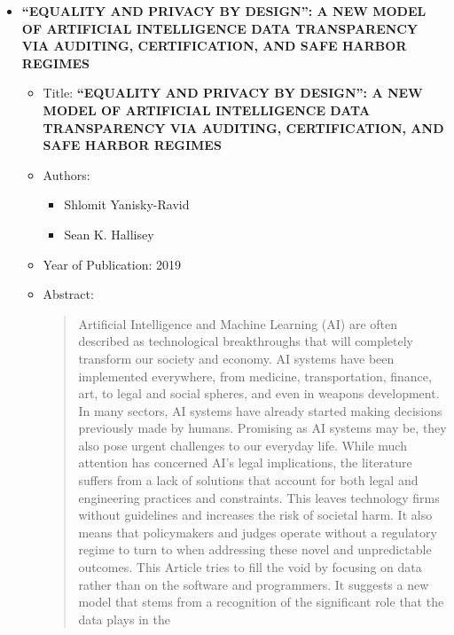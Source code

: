 \documentclass{article}
\begin{document}
\begin{itemize}
        \item \textbf{“EQUALITY AND PRIVACY BY DESIGN”:         
        A NEW MODEL OF ARTIFICIAL 
        INTELLIGENCE DATA TRANSPARENCY VIA 
        AUDITING, CERTIFICATION, AND SAFE 
        HARBOR REGIMES}
        \begin{itemize}
            \item Title: \textbf{“EQUALITY AND PRIVACY BY DESIGN”:         
            A NEW MODEL OF ARTIFICIAL 
            INTELLIGENCE DATA TRANSPARENCY VIA 
            AUDITING, CERTIFICATION, AND SAFE 
            HARBOR REGIMES}
            \item Authors:
            \begin{itemize}
                \item Shlomit Yanisky-Ravid
                \item Sean K. Hallisey
            \end{itemize}
            \item Year of Publication: 2019
            \item Abstract:
            \begin{abstract}
                Artificial Intelligence and Machine Learning (AI) are often 
                described as technological breakthroughs that will completely 
                transform our society and economy.  AI systems have been 
                implemented everywhere, from medicine, transportation, finance, art, 
                to  legal  and  social  spheres,  and  even  in  weapons  development.    In  
                many sectors, AI systems have already started making decisions 
                previously  made  by  humans.    Promising  as  AI  systems  may  be,  they  
                also pose urgent challenges to our everyday life.  While much 
                attention  has  concerned  AI’s  legal  implications,  the  literature  suffers  
                from  a  lack  of  solutions  that  account  for  both  legal  and  engineering  
                practices and constraints.  This leaves technology firms without guidelines and increases the risk of societal harm.  It also means that 
                policymakers and judges operate without a regulatory regime to turn 
                to  when  addressing  these  novel  and  unpredictable  outcomes.    This  
                Article  tries  to  fill  the  void  by  focusing  on  data  rather  than  on  the  
                software and programmers.  It suggests a new model that stems from 
                a recognition of the significant role that the data plays in the    

\end{abstract}
\end{itemize}
\end{itemize}
\end{document}
